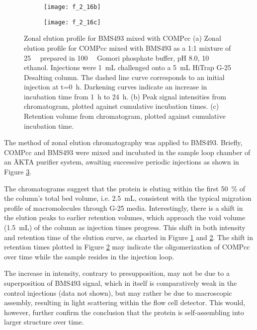 \begin{refsection}
\begin{figure}[h!]
    \begin{subfigure}[b]{0.5\textwidth}
        \texttt{[image: f\_2\_16b]}
        \caption{}
        \label{fig:ze_intensity}
    \end{subfigure}
    \begin{subfigure}[b]{0.45\textwidth}
        \texttt{[image: f\_2\_16c]}
        \caption{}
        \label{fig:ze_retention_times}
    \end{subfigure} \caption{Zonal elution profile for BMS493 mixed with
    COMPcc (a) Zonal elution profile for COMPcc mixed with BMS493 as a 1:1
        mixture of \SI{25}{\micro\moLar} prepared in \SI{100}{\milli\moLar}
        Gomori phosphate buffer, pH 8.0, \SI{10}{\volper} ethanol. Injections
        were \SI{1}{\mL} challenged onto a \SI{5}{\mL} HiTrap G-25 Desalting column.
        The dashed line curve corresponds to an initial injection at
        t=\SI{0}{\hour}. Darkening curves indicate an increase in incubation
        time from \SI{1}{\hour} to \SI{24}{\hour}. (b) Peak signal intensities
        from chromatogram, plotted against cumulative incubation times. (c)
        Retention volume from chromatogram, plotted against cumulative
        incubation time.
    }\label{fig:zonal_elution_report}
\end{figure}
The method of zonal elution chromatography was applied to BMS493. Briefly,
COMPcc and BMS493 were mixed and incubated in the sample loop chamber of an
\"{A}KTA purifier system, awaiting successive periodic injections as shown in
Figure \ref{fig:zonal_elution_report}. 

The chromatograms suggest that the protein is eluting within the first
\SI{50}{\percent} of the column's total bed volume, i.e. \SI{2.5}{\mL},
consistent with the typical migration profile of macromolecules through G-25
media.  Interestingly, there is a shift in the elution peaks to earlier
retention volumes, which approach the void volume (\SI{1.5}{\mL}) of the column
as injection times progress. This shift in both intensity and retention time of
the elution curve, as charted in Figure \ref{fig:ze_intensity} and
\ref{fig:ze_retention_times}. The shift in retention times plotted in Figure
\ref{fig:ze_retention_times} may indicate the oligomerization of COMPcc over time
while the sample resides in the injection loop.

The increase in intensity, contrary to presupposition, may not be due to a
superposition of BMS493 signal, which in itself is comparatively weak in the
control injections (data not shown), but may rather be due to macroscopic
assembly, resulting in light scattering within the flow cell detector. This
would, however, further confirm the conclusion that the protein is
self-assembling into larger structure over time.


\end{refsection}
